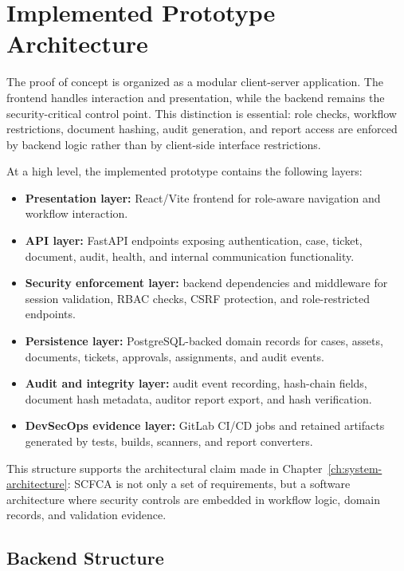 \documentclass[12pt,a4paper]{report}
\begin{document}
\section{Implemented Prototype Architecture}


The proof of concept is organized as a modular client-server application. The frontend handles interaction and presentation, while the backend remains the security-critical control point. This distinction is essential: role checks, workflow restrictions, document hashing, audit generation, and report access are enforced by backend logic rather than by client-side interface restrictions.

At a high level, the implemented prototype contains the following layers:

\begin{itemize}
    \item \textbf{Presentation layer:} React/Vite frontend for role-aware navigation and workflow interaction.
    \item \textbf{API layer:} FastAPI endpoints exposing authentication, case, ticket, document, audit, health, and internal communication functionality.
    \item \textbf{Security enforcement layer:} backend dependencies and middleware for session validation, RBAC checks, CSRF protection, and role-restricted endpoints.
    \item \textbf{Persistence layer:} PostgreSQL-backed domain records for cases, assets, documents, tickets, approvals, assignments, and audit events.
    \item \textbf{Audit and integrity layer:} audit event recording, hash-chain fields, document hash metadata, auditor report export, and hash verification.
    \item \textbf{DevSecOps evidence layer:} GitLab CI/CD jobs and retained artifacts generated by tests, builds, scanners, and report converters.
\end{itemize}

This structure supports the architectural claim made in Chapter~\ref{ch:system-architecture}: SCFCA is not only a set of requirements, but a software architecture where security controls are embedded in workflow logic, domain records, and validation evidence.

\subsection{Backend Structure}
\end{document}
